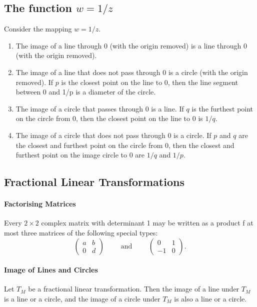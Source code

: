 \subsection{The function \texorpdfstring{\(w = 1 / z\)}{w = 1/z}}
Consider the mapping \(w = 1 /z\).
\begin{enumerate}[label=(\arabic*)]
    \item The image of a line through 0 (with the origin removed) is a line through 0 (with the origin removed).
    \item The image of a line that does not pass through 0 is a circle (with the origin removed). If \(p\) is the closest point on the line to 0, then the line segment between 0 and 1/p is a diameter of the circle.
    \item The image of a circle that passes through 0 is a line. If \(q\) is the furthest point on the circle from 0, then the closest point on the line to 0 is \(1/q\).
    \item The image of a circle that does not pass through 0 is a circle. If \(p\) and \(q\) are the closest and furthest point on the circle from 0, then the closest and furthest point on the image circle to 0 are \(1 / q\) and \(1 / p\).
\end{enumerate}

\subsection{Fractional Linear Transformations}
\paragraph{Factorising Matrices}
Every \(2 \times 2\) complex matrix with determinant 1 may be written as a product f at most three matrices of the following special types:
\[\begin{pmatrix}
    a & b \\
    0 & d
\end{pmatrix} \qquad \text{ and } \qquad
\begin{pmatrix}
    0 & 1 \\
    -1 & 0
\end{pmatrix}.\]

\paragraph{Image of Lines and Circles}
Let \(T_M\) be a fractional linear transformation. Then the image of a line under \(T_M\) is a line or a circle, and the image of a circle under \(T_M\) is also a line or a circle.